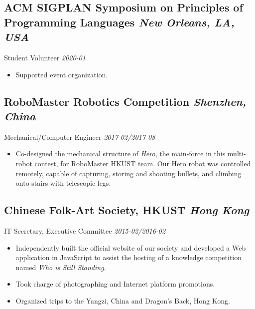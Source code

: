 \documentclass[11pt]{article}
\newcommand{\subsec}[2]{\subsection*{#1 \hfill {\normalfont\itshape #2}}}
\newcommand{\subsecdesc}[2]{{#1 \hfill \itshape #2}}
\begin{document}
  \subsec{ACM SIGPLAN Symposium on Principles of Programming Languages}
         {New Orleans, LA, USA}
  \subsecdesc{Student Volunteer}
             {2020-01}
  \begin{itemize}
    \item Supported event organization.
  \end{itemize}

  \subsec{RoboMaster Robotics Competition}
         {Shenzhen, China}
  \subsecdesc{Mechanical/Computer Engineer}
             {2017-02/2017-08}
  \begin{itemize}
    \item Co-designed the mechanical structure of \emph{Hero}, the main-force in
      this multi-robot contest, for RoboMaster HKUST team. Our Hero robot was
      controlled remotely, capable of capturing, storing and shooting bullets,
      and climbing onto stairs with telescopic legs.
  \end{itemize}

  \subsec{Chinese Folk-Art Society, HKUST}
         {Hong Kong}
  \subsecdesc{IT Secretary, Executive Committee}
             {2015-02/2016-02}
  \begin{itemize}
    \item Independently built the official website of our society and developed
      a Web application in JavaScript to assist the hosting of a knowledge
      competition named \emph{Who is Still Standing}.
    \item Took charge of photographing and Internet platform promotions.
    \item Organized trips to the Yangzi, China and Dragon's Back, Hong Kong.
  \end{itemize}
\fi
\end{document}
